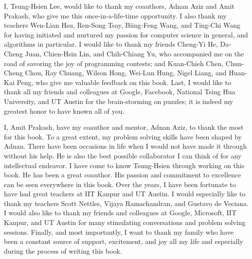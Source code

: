 \documentclass[10pt,openany,twoside,letterpaper,extrafontsizes]{memoir}
\begin{document}
I, Tsung-Hsien Lee, would like to thank my coauthors, Adnan Aziz and Amit Prakash,
who give me this once-in-a-life-time opportunity. I also
thank my teachers
Wen-Lian Hsu, Ren-Song Tsay, Biing-Feng Wang, and Ting-Chi Wang
for having initiated and nurtured my passion for computer science
in general, and algorithms in particular.
I would like to
thank my friends Cheng-Yi He, Da-Cheng Juan, Chien-Hsin Lin, and Chih-Chiang Yu, who
accompanied me on the road of savoring the joy of programming contests; and
Kuan-Chieh Chen, Chun-Cheng Chou, Ray Chuang, Wilson Hong, Wei-Lun Hung, Nigel Liang,
and Huan-Kai Peng, who give me valuable feedback on this book.
Last, I would like to thank all my friends and colleagues at Google, Facebook, National Tsing Hua University, and UT Austin for the brain-storming on
puzzles; it is indeed my greatest honor to have known all of you.

I, Amit Prakash, have my coauthor and mentor, Adnan Aziz, to thank the
most for this book. To a great extent, my problem solving skills have
been shaped by Adnan. There have been occasions in life when I would not
have made it through without his help. He is also the best possible
collaborator I can think of for any intellectual endeavor.
I have come to know Tsung-Hsien through working on this book.
He has been a great coauthor. His passion and commitment to excellence
can be seen everywhere in this book.
Over the years, I have been fortunate to have had great teachers at IIT Kanpur and UT
Austin. I would especially like to thank my teachers
Scott Nettles, Vijaya Ramachandran, and Gustavo de Veciana.
I would also like to thank my friends and colleagues at Google,
Microsoft, IIT Kanpur, and UT Austin for many stimulating conversations and
problem solving sessions. Finally, and most importantly, I want to thank
my family who have been a constant source of support, excitement, and
joy all my life and especially during the process of writing this book.

\vspace{0.12in}
\\
\\
\\
\noindent {\large\textit{\today}}


\end{document}
